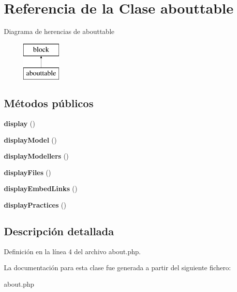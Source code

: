 \hypertarget{classabouttable}{\section{\-Referencia de la \-Clase abouttable}
\label{classabouttable}
}
\-Diagrama de herencias de abouttable\begin{figure}[H]
\begin{center}
\leavevmode
\includegraphics[height=2.000000cm]{classabouttable}
\end{center}
\end{figure}
\subsection*{\-Métodos públicos}
\begin{DoxyCompactItemize}
\item 
\hypertarget{classabouttable_ac0f2c0d925796601544d584613e05e47}{{\bfseries display} ()}\label{classabouttable_ac0f2c0d925796601544d584613e05e47}

\item 
\hypertarget{classabouttable_a97836320a206e585f3e682fa570a55b3}{{\bfseries display\-Model} ()}\label{classabouttable_a97836320a206e585f3e682fa570a55b3}

\item 
\hypertarget{classabouttable_a175c3aa085ab45e2783ee0f5e7929c30}{{\bfseries display\-Modellers} ()}\label{classabouttable_a175c3aa085ab45e2783ee0f5e7929c30}

\item 
\hypertarget{classabouttable_aea286997a07d462392d4124cb11c38fe}{{\bfseries display\-Files} ()}\label{classabouttable_aea286997a07d462392d4124cb11c38fe}

\item 
\hypertarget{classabouttable_a53647b9d4cec21fea7c3c5a591561d17}{{\bfseries display\-Embed\-Links} ()}\label{classabouttable_a53647b9d4cec21fea7c3c5a591561d17}

\item 
\hypertarget{classabouttable_a783812e4a907615c4d195905f695e170}{{\bfseries display\-Practices} ()}\label{classabouttable_a783812e4a907615c4d195905f695e170}

\end{DoxyCompactItemize}


\subsection{\-Descripción detallada}


\-Definición en la línea 4 del archivo about.\-php.



\-La documentación para esta clase fue generada a partir del siguiente fichero\-:\begin{DoxyCompactItemize}
\item 
about.\-php\end{DoxyCompactItemize}
